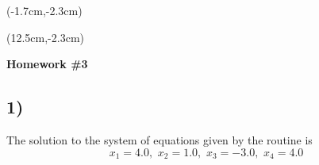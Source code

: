 \documentclass[12pt, oneside]{article}
\begin{document}
\begin{textblock*}{4cm}(-1.7cm,-2.3cm)
\end{textblock*}

\begin{textblock*}{8cm}(12.5cm,-2.3cm)
\end{textblock*}


\vspace{1cm}

\makeatletter
\setlength{\@fptop}{0pt}
\makeatother

\begin{center}
\textbf{\Large Homework \#3}
\end{center}


\subsection*{1)}
The solution to the system of equations given by the routine is
\[x_{1} = 4.0,\,\,x_{2} = 1.0,\,\,x_{3} = -3.0,\,\,x_{4} = 4.0\]
\end{document}
